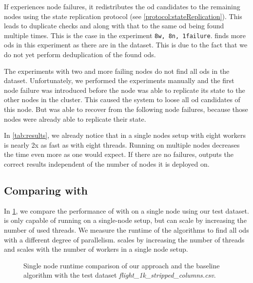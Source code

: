   If \dodo{} experiences node failures, it redistributes the \gls{od} candidates to the remaining nodes using the state replication protocol (see \cref{protocol:stateReplication}).
  This leads to duplicate checks and along with that to the same \gls{od} being found multiple times.
  This is the case in the experiment \texttt{8w, 8n, 1failure}.
  \dodo{} finds more \glspl{od} in this experiment as there are in the dataset.
  This is due to the fact that we do not yet perform deduplication of the found \glspl{od}.

  The experiments with two and more failing nodes do not find all \glspl{od} in the dataset.
  Unfortunately, we performed the experiments manually and the first node failure was introduced before the node was able to replicate its state to the other nodes in the cluster.
  This caused the system to loose all \gls{od} candidates of this node.
  But \dodo{} was able to recover from the following node failures, because those nodes were already able to replicate their state.

  In \cref{tab:results}, we already notice that \dodo{} in a single nodes setup with eight workers is nearly 2x as fast as \ocddiscover{} with eight threads.
  Running \dodo{} on multiple nodes decreases the time even more as one would expect.
  If there are no failures, \dodo{} outputs the correct results independent of the number of nodes it is deployed on.
  
\subsection{Comparing with \ocddiscover{}}\label{sec:evaluation:comparison}

  In \cref{fig:runtime-vs-ocddiscover}, we compare the performance of \dodo{} with \ocddiscover{} on a single node using our test dataset.
  \ocddiscover{} is only capable of running on a single-node setup, but can scale by increasing the number of used threads.
  We measure the runtime of the algorithms to find all \glspl{od} with a different degree of parallelism.
  \ocddiscover{} scales by increasing the number of threads and \dodo{} scales with the number of workers in a single node setup.

  \begin{figure}
    \centering
%    
    
    \caption{Single node runtime comparison of our approach and the baseline algorithm \ocddiscover{} with the test dataset \textit{flight\_1k\_stripped\_columns.csv}.}
    \label{fig:runtime-vs-ocddiscover}
  \end{figure}

